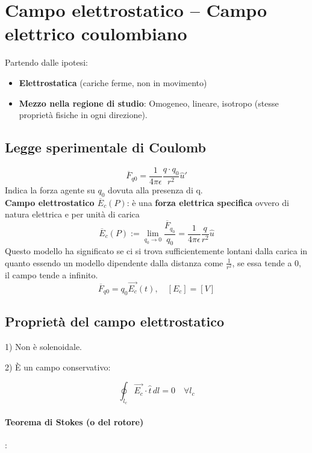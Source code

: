 \section{Campo elettrostatico – Campo elettrico coulombiano}
Partendo dalle ipotesi:
\begin{itemize}
    \item \textbf{Elettrostatica} (cariche ferme, non in movimento)
    \item \textbf{Mezzo nella regione di studio}:
   Omogeneo, lineare, isotropo (stesse proprietà fisiche in ogni direzione).
\end{itemize}

\subsection{Legge sperimentale di Coulomb}
    \[
        \overline{F}_{q0} = \frac{1}{4\pi\epsilon}\frac{q\cdot q_0}{r^2}\hat{u}'
    \]
    Indica la forza agente su $q_0$ dovuta alla presenza di q.\\

    \textbf{Campo elettrostatico $\overline{E}_c(P)$}: è una \textbf{forza elettrica specifica} ovvero di natura elettrica e per unità di carica
    \[
        \overline{E}_c(P) := \lim_{q_0 \to 0} \frac{\overline{F}_{q_0}}{q_0} = \frac{1}{4\pi\epsilon}\frac{q}{r^2}\hat{u}
    \]
    Questo modello ha significato se ci si trova sufficientemente lontani dalla carica in quanto essendo un modello dipendente dalla distanza come $\frac{1}{r^2}$, se essa tende a 0, il campo tende a infinito.
    \[
        \overline{F}_{q0} = q_0 \vec{E_c}(t), \quad [E_c] = [V]
    \]

\subsection{Proprietà del campo elettrostatico}

1) Non è solenoidale.

2) È un campo conservativo:

\[
\oint_{l_c} \vec{E_c} \cdot \hat{t}\,dl = 0 \quad \forall l_c
\]

\paragraph{Teorema di Stokes (o del rotore)}:

